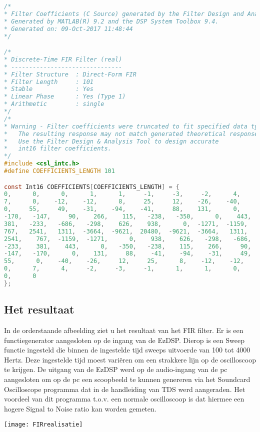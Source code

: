            \begin{lstlisting}[language=c]
/*
* Filter Coefficients (C Source) generated by the Filter Design and Analysis Tool
* Generated by MATLAB(R) 9.2 and the DSP System Toolbox 9.4.
* Generated on: 09-Oct-2017 11:48:44
*/

/*
* Discrete-Time FIR Filter (real)
* -------------------------------
* Filter Structure  : Direct-Form FIR
* Filter Length     : 101
* Stable            : Yes
* Linear Phase      : Yes (Type 1)
* Arithmetic        : single
*/
/*
* Warning - Filter coefficients were truncated to fit specified data type.  
*   The resulting response may not match generated theoretical response.
*   Use the Filter Design & Analysis Tool to design accurate
*   int16 filter coefficients.
*/
#include <csl_intc.h>
#define COEFFICIENTS_LENGTH 101

const Int16 COEFFICIENTS[COEFFICIENTS_LENGTH] = {
0,      0,      0,      1,      1,     -1,     -3,     -2,      4,
7,      0,    -12,    -12,      8,     25,     12,    -26,    -40,
0,     55,     49,    -31,    -94,    -41,     88,    131,      0,
-170,   -147,     90,    266,    115,   -238,   -350,      0,    443,
381,   -233,   -686,   -298,    626,    938,      0,  -1271,  -1159,
767,   2541,   1311,  -3664,  -9621,  20480,  -9621,  -3664,   1311,
2541,    767,  -1159,  -1271,      0,    938,    626,   -298,   -686,
-233,    381,    443,      0,   -350,   -238,    115,    266,     90,
-147,   -170,      0,    131,     88,    -41,    -94,    -31,     49,
55,      0,    -40,    -26,     12,     25,      8,    -12,    -12,
0,      7,      4,     -2,     -3,     -1,      1,      1,      0,
0,      0
};	
            \end{lstlisting}
            \clearpage
        
        
            \subsection{Het resultaat}
          
In de orderstaande afbeelding ziet u het resultaat van het FIR filter. Er is een functiegenerator aangesloten op de ingang van de EzDSP. Dierop is een Sweep functie ingesteld die binnen de ingestelde tijd sweeps uitvoerde van 100 tot 4000 Hertz. Deze ingestelde tijd moest vari\"eren om een strakkere lijn op de oscilloscoop te krijgen. De uitgang van de EzDSP werd op de audio-ingang van de pc aangesloten om op de pc een scoopbeeld te kunnen genereren via het Soundcard Oscilloscope programma dat in de handleiding van TDS werd aangeraden. Het voordeel van dit programma t.o.v. een normale oscilloscoop is dat hiermee een hogere Signal to Noise ratio kan worden gemeten.
  
    \texttt{[image: FIRrealisatie]}\par\vspace{1cm}            	
		            
            \clearpage
            